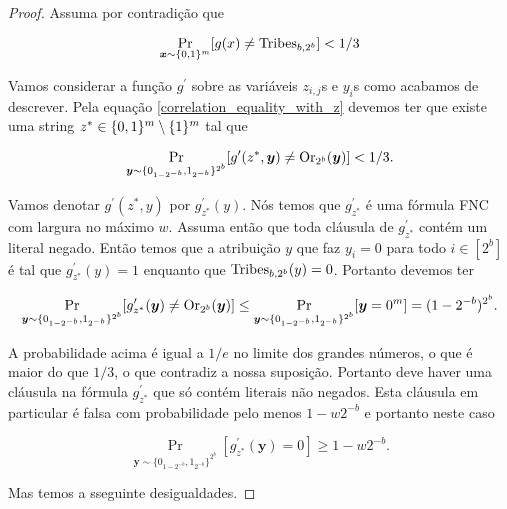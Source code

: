 \begin{proof}

Assuma por contradição que

\begin{equation*}
    \Pr_{\boldsymbol{x} \sim \{0, 1\}^{m}}[g(x) \neq \text{Tribes}_{b, 2^{b}}] < 1/3
\end{equation*}

Vamos considerar a função $g^{\prime}$ sobre as variáveis $z_{i, j}$s e $y_{i}$s como acabamos de descrever. Pela equação \ref{correlation_equality_with_z} devemos ter que existe uma string $z^{*} \in \{0, 1\}^{m} \setminus \{1\}^{m}$ tal que

\begin{equation*}
    \Pr_{\boldsymbol{y} \sim \{0_{1 - 2^{-b}}, 1_{2^{-b}} \}^{2^{b}}}[g^{\prime}(z^{*}, \boldsymbol{y}) \neq \text{Or}_{2^{b}}(\boldsymbol{y})] < 1/3.
\end{equation*}

Vamos denotar $g^{\prime}(z^{*}, y)$ por $g_{z^{*}}^{\prime}(y)$. Nós temos que $g_{z^{*}}^{\prime}$ é uma fórmula FNC com largura no máximo $w$. Assuma então que toda cláusula de $g_{z^{*}}^{\prime}$ contém um literal negado. Então temos que a atribuição $y$ que faz $y_{i} = 0$ para todo $i \in [2^{b}]$ é tal que $g_{z^{*}}^{\prime}(y) = 1$ enquanto que $\text{Tribes}_{b, 2^{b}}(y) = 0$. Portanto devemos ter

\begin{equation*}
    \Pr_{\boldsymbol{y} \sim \{0_{1 - 2^{-b}}, 1_{2^{-b}}\}^{2^{b}}}[g_{z^{*}}^{\prime}(\boldsymbol{y}) \neq \text{Or}_{2^{b}}(\boldsymbol{y})] \leq \Pr_{\boldsymbol{y} \sim \{0_{1 - 2^{-b}}, 1_{2^{-b}} \}^{2^{b}}}[\boldsymbol{y} = 0^{m}] = (1 - 2^{-b})^{2^{b}}.
\end{equation*}

A probabilidade acima é igual a $1/e$ no limite dos grandes números, o que é maior do que $1/3$, o que contradiz a nossa suposição. Portanto deve haver uma cláusula na fórmula $g_{z^{*}}^{\prime}$ que só contém literais não negados. Esta cláusula em particular é falsa com probabilidade pelo menos $1 - w2^{-b}$ e portanto neste caso

\begin{equation*}
    \Pr_{\boldsymbol{y} \sim \{0_{1 - 2^{-b}}, 1_{2^{-b}} \}^{2^{b}}}[g_{z^{*}}^{\prime}(\boldsymbol{y}) = 0] \geq 1 - w2^{-b}.
\end{equation*}

Mas temos a sseguinte desigualdades.


\end{proof}
